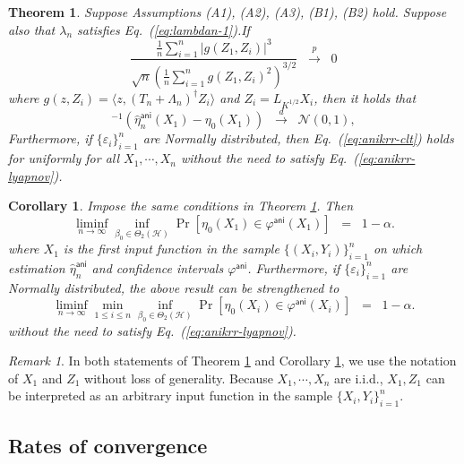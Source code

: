 \documentclass[11pt,a4paper]{article}
\renewcommand{\hat}{\widehat}
\theoremstyle{definition}
\theoremstyle{plain}
\newtheorem{theorem}{Theorem}[section]
\newtheorem{corollary}{Corollary}[section]
\theoremstyle{remark}
\newtheorem{remark}{Remark}[section]
\newcommand{\mH}{\mathcal H}
\newcommand{\ani}{\mathsf{ani}}
\begin{document}
\begin{theorem}
Suppose Assumptions (A1), (A2), (A3), (B1), (B2) hold. Suppose also that $\lambda_n$ satisfies Eq.~(\ref{eq:lambdan-1}).If 
\begin{equation}
\frac{\frac{1}{n}\sum_{i=1}^n |g(Z_1,Z_i)|^3}{\sqrt{n}(\frac{1}{n}\sum_{i=1}^n g(Z_1,Z_i)^2)^{3/2}}\;\;\overset{p}{\to}\;\; 0
\label{eq:anikrr-lyapnov}
\end{equation}
where $g(z,Z_i)=\langle z,(T_n+\Lambda_n)^{\dagger}Z_i\rangle$ and $Z_i=L_{K^{1/2}}X_i$, then it holds that
\begin{equation}
[\hat\sigma_n^\ani(Z_1)]^{-1}(\hat\eta_n^\ani(X_1)-\eta_0(X_1)) \;\;\overset{d}{\to}\;\;\mathcal N(0,1),
\label{eq:anikrr-clt}
\end{equation}
Furthermore, if $\{\varepsilon_i\}_{i=1}^n$ are Normally distributed, then Eq.~(\ref{eq:anikrr-clt}) holds for \emph{uniformly} for all $X_1,\cdots,X_n$ without the need to satisfy Eq.~(\ref{eq:anikrr-lyapnov}).
\label{thm:anikrr-limiting}
\end{theorem}

\begin{corollary}
Impose the same conditions in Theorem \ref{thm:anikrr-limiting}. Then 
$$
\liminf_{n\to\infty}\inf_{\beta_0\in\Theta_2(\mH)}\Pr[\eta_0(X_1)\in\varphi^\ani(X_1)] \;\; = \;\; 1-\alpha.
$$
where $X_1$ is the first input function in the sample $\{(X_i,Y_i)\}_{i=1}^n$ on which estimation $\hat\eta_n^{\ani}$ and confidence intervals $\varphi^\ani$.
Furthermore, if $\{\varepsilon_i\}_{i=1}^n$ are Normally distributed, the above result can be strengthened to
$$
\liminf_{n\to\infty}\min_{1\leq i\leq n}\inf_{\beta_0\in\Theta_2(\mH)}\Pr[\eta_0(X_i)\in\varphi^\ani(X_i)] \;\; = \;\; 1-\alpha.
$$
without the need to satisfy Eq.~(\ref{eq:anikrr-lyapnov}).
\label{cor:anikrr-ci}
\end{corollary}

\begin{remark}
In both statements of Theorem \ref{thm:anikrr-limiting} and Corollary \ref{cor:anikrr-ci}, we use the notation of $X_1$ and $Z_1$ without loss of generality.
Because $X_1,\cdots,X_n$ are i.i.d., $X_1,Z_1$ can be interpreted as an arbitrary input function in the sample $\{X_i,Y_i\}_{i=1}^n$.
\end{remark}

\subsection{Rates of convergence}
\end{document}
